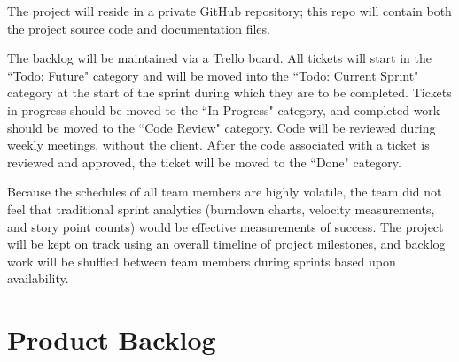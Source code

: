 The project will reside in a private GitHub repository; this repo will contain both the project source code and documentation files.

The backlog will be maintained via a Trello board. All tickets will start in the ``Todo: Future" category and will be moved into the ``Todo: Current Sprint" category at the start of the sprint during which they are to be completed. Tickets in progress should be moved to the ``In Progress" category, and completed work should be moved to the ``Code Review" category. Code will be reviewed during weekly meetings, without the client. After the code associated with a ticket is reviewed and approved, the ticket will be moved to the ``Done" category.

Because the schedules of all team members are highly volatile, the team did not feel that traditional sprint analytics (burndown charts, velocity measurements, and story point counts) would be effective measurements of success. The project will be kept on track using an overall timeline of project milestones, and backlog work will be shuffled between team members during sprints based upon availability.

\section{Product Backlog}
 
